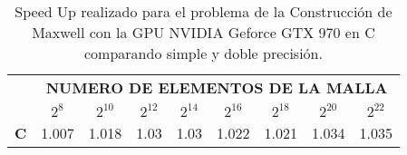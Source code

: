 \begin{table}[h!]
\centering
    \begin{tabular}{|c|c|c|c|c|c|c|c|c|}
    \hline
    \multirow{2}{*}{} & \multicolumn{8}{c|}{\textbf{NUMERO DE ELEMENTOS DE LA MALLA}} \\ \cline{2-9} 
                      & $2^{8}$ & $2^{10}$& $2^{12}$& $2^{14}$& $2^{16}$& $2^{18}$& $2^{20}$& $2^{22}$\\ \hline
    \textbf{C}        & 1.007 & 1.018 & 1.03  & 1.03  & 1.022 & 1.021 & 1.034 & 1.035 \\ \hline
    \end{tabular}
    \caption{Speed Up realizado para el problema de la Construcción de Maxwell con la GPU NVIDIA Geforce GTX 970 en C comparando simple y doble precisión.}
    \label{tab:c_970_MxC_c_10}
    \end{table}